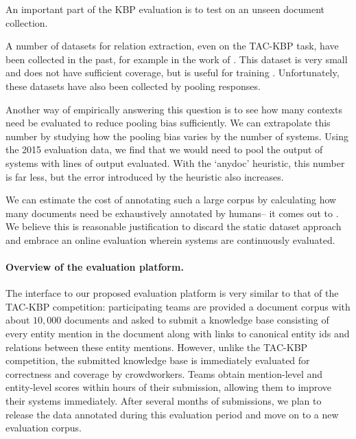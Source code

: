 An important part of the KBP evaluation is to test on an unseen document collection.

A number of datasets for relation extraction, even on the TAC-KBP task, have been collected in the past, for example in the work of \citet{angeli2014combining}.
This dataset is very small  and does not have sufficient coverage, but is useful for training .
Unfortunately, these datasets have also been collected by pooling responses. 

Another way of empirically answering this question is to see how many contexts need be evaluated to reduce pooling bias sufficiently. We can extrapolate this number by studying how the pooling bias varies by the number of systems.
Using the 2015 evaluation data, we find that we would need to pool the output of  systems with  lines of output  evaluated.
With the `anydoc' heuristic, this number is far less, but the error introduced by the heuristic also increases.

We can estimate the cost of annotating such a large corpus by calculating how many documents need be exhaustively annotated by humans-- it comes out to . 
We believe this is reasonable justification to discard the static dataset approach and embrace an online evaluation wherein systems are continuously evaluated.

\paragraph{Overview of the evaluation platform.}
The interface to our proposed evaluation platform is very similar to that of the TAC-KBP competition:
  participating teams are provided a document corpus with about $10,000$ documents
  and asked to submit a knowledge base consisting of every entity mention in the document along with links to canonical entity ids and relations between these entity mentions.
However, unlike the TAC-KBP competition, the submitted knowledge base is immediately evaluated for correctness and coverage by crowdworkers.
Teams obtain mention-level and entity-level scores within hours of their submission, allowing them to improve their systems immediately.
After several months of submissions, we plan to release the data annotated during this evaluation period and move on to a new evaluation corpus. 

